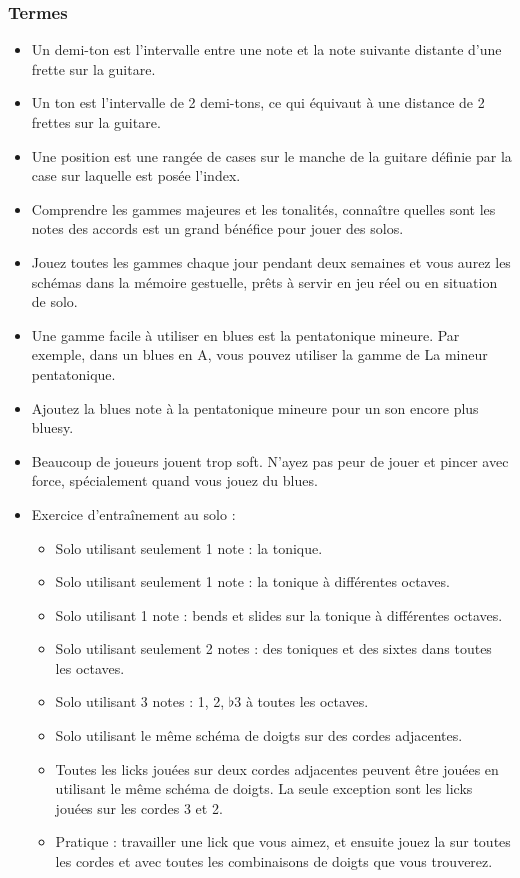 \documentclass[a4paper]{book}
\begin{document}
\subsubsection{Termes}
\begin{itemize}
\item Un demi-ton est l'intervalle entre une note et la note suivante distante d'une frette sur la guitare.
\item Un ton est l'intervalle de 2 demi-tons, ce qui équivaut à une distance de 2 frettes sur la guitare.
\item Une position est une rangée de cases sur le manche de la guitare définie par la case sur laquelle est posée l'index.
\item Comprendre les gammes majeures et les tonalités, connaître quelles sont les notes des accords est un grand bénéfice pour jouer des solos.
\item Jouez toutes les gammes chaque jour pendant deux semaines et vous aurez les schémas dans la mémoire gestuelle, prêts à servir en jeu réel ou en situation de solo.
\item Une gamme facile à utiliser en blues est la pentatonique mineure. Par exemple, dans un blues en A, vous pouvez utiliser la gamme de La mineur pentatonique.
\item Ajoutez la blues note à la pentatonique mineure pour un son encore plus bluesy.
\item Beaucoup de joueurs jouent trop soft. N'ayez pas peur de jouer et pincer avec force, spécialement quand vous jouez du blues.
\item Exercice d'entraînement au solo :
\begin{itemize}
\item Solo utilisant seulement 1 note : la tonique.
\item Solo utilisant seulement 1 note : la tonique à différentes octaves.
\item Solo utilisant 1 note : bends et slides sur la tonique à différentes octaves.
\item Solo utilisant seulement 2 notes : des toniques et des sixtes dans toutes les octaves.
\item Solo utilisant 3 notes : 1, 2, $\flat$3 à toutes les octaves.
\item Solo utilisant le même schéma de doigts sur des cordes adjacentes.
\item Toutes les licks jouées sur deux cordes adjacentes peuvent être jouées en utilisant le même schéma de doigts. La seule exception sont les licks jouées sur les cordes 3 et 2.
\item Pratique : travailler une lick que vous aimez, et ensuite jouez la sur toutes les cordes et avec toutes les combinaisons de doigts que vous trouverez.
\end{itemize}
\end{itemize}
\end{document}
